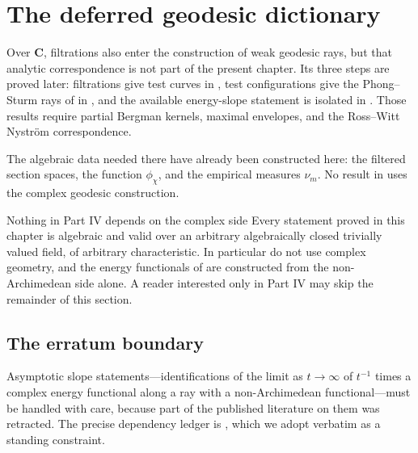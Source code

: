 \section{The deferred geodesic dictionary}
\label{sec:ch33-geodesic-deferred}

Over $\mathbf C$, filtrations also enter the construction of weak
geodesic rays, but that analytic correspondence is not part of the present
chapter.  Its three steps are proved later: filtrations give test curves in
, test configurations give the
Phong--Sturm rays of \cite{PS07} in , and the
available energy-slope statement is isolated in
.  Those results require partial Bergman kernels,
maximal envelopes, and the Ross--Witt Nystr\"om correspondence.

The algebraic data needed there have already been constructed here: the
filtered section spaces, the function $\phi_\chi$, and the empirical
measures $\nu_m$.  No result in
 uses the complex
geodesic construction.

\begin{warning}{Nothing in Part IV depends on the complex side}
\label{warn:ch33-no-complex-input}
Every statement proved in this chapter is algebraic and valid over an
arbitrary algebraically closed trivially valued field, of arbitrary
characteristic.  In particular
 do not use complex
geometry, and the energy functionals of  are
constructed from the non-Archimedean side alone.  A reader interested only
in Part IV may skip the remainder of this section.
\end{warning}

\subsection{The erratum boundary}
\label{sec:ch33-erratum-boundary}

Asymptotic slope statements---identifications of the limit as
$t\to\infty$ of $t^{-1}$ times a complex energy functional along a ray
with a non-Archimedean functional---must be handled with care, because part
of the published literature on them was retracted.  The precise dependency
ledger is , which we adopt verbatim as a standing
constraint.

